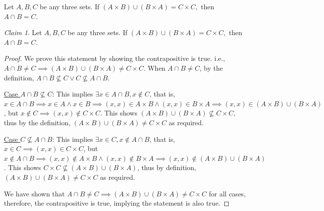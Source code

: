 \documentclass{homework}
\theoremstyle{remark}
\newtheorem*{claim}{Claim}
\newcommand{\?}{\stackrel{?}{=}}
\begin{document}
\question Let $A,B,C$ be any three sets. If $(A\times B)\cup(B\times A)=C\times C,$ then $A\cap B=C.$
\begin{claim}
   Let $A,B,C$ be any three sets. If $(A\times B)\cup(B\times A)=C\times C,$ then $A\cap B=C.$
\end{claim}
\begin{proof}
    We prove this statement by showing the contrapositive is true. i.e., $A\cap B\neq C \implies (A\times B)\cup(B\times A)\neq C\times C$. When $A\cap B\neq C$, by the definition, $A\cap B\not\subseteq C\lor C\not\subseteq A\cap B$. 

    \underline{Case $A\cap B\not\subseteq C$}: This implies $\exists x\in A\cap B, x\notin C$, that is, $x\in A\cap B\implies x\in A \land x\in B\implies (x,x)\in A\times B \land (x,x)\in B\times A\implies (x,x)\in (A\times B)\cup (B\times A)$, but $x\notin C\implies (x,x)\notin C\times C$. This shows $(A\times B)\cup (B\times A)\not\subseteq C\times C$, thus by the definition, $(A\times B)\cup(B\times A)\neq C\times C$ as required. 

    \underline{Case $C\not\subseteq A\cap B$}: This implies $\exists x\in C, x\notin A\cap B$, that is, $x\in C\implies (x,x)\in C\times C$, but $x\notin A\cap B\implies (x,x)\notin A\times B\land (x,x)\notin B\times A\implies (x,x)\notin (A\times B)\cup(B\times A)$. This shows $C\times C\not\subseteq (A\times B)\cup(B\times A)$, thus by definition, $(A\times B)\cup(B\times A)\neq C\times C$ as required.

    We have shown that $A\cap B\neq C \implies (A\times B)\cup(B\times A)\neq C\times C$ for all cases, therefore, the contrapositive is true, implying the statement is also true.
\end{proof}


\end{document}
